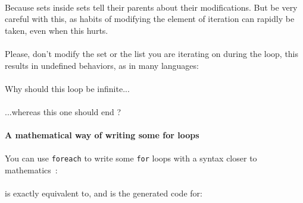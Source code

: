 \documentclass{article}
\let\subsubsubsection\paragraph
\begin{document}
\begin{sloppypar}
            
\paragraph{}
Because sets inside sets tell their parents about their modifications. But be very careful with this, as habits of modifying the element of iteration can rapidly be taken, even when this hurts.

            
\paragraph{}
Please, don't modify the set or the list you are iterating on during the loop, this results in undefined behaviors, as in many languages:

            {}
            
\paragraph{}
Why should this loop be infinite...

            {}
            
\paragraph{}
...whereas this one should end ?
         
         
         

\subsubsubsection{ A mathematical way of writing some for loops\\}
\paragraph{}
You can use \verb!foreach! to write some \verb!for! loops with a syntax closer to mathematics :
            
            {}

            
\paragraph{}
is exactly equivalent to, and is the generated code for:

            {}
            

\end{sloppypar}
\end{document}
